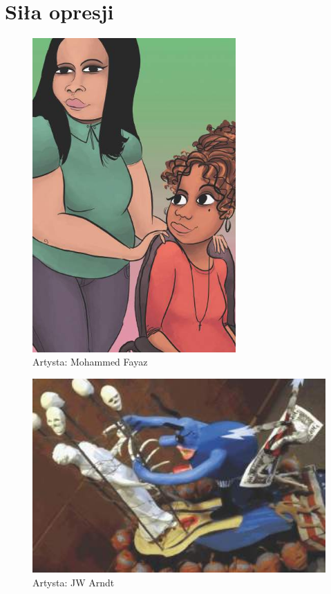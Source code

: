 \chapter{Siła opresji}
\begin{figure}[h]
\centering
\includegraphics[height=12cm]{TeX_files/2-0.png}
\caption{Artysta: Mohammed Fayaz}
\label{2-0}
\end{figure}


\newpage
\begin{figure}[h]
\centering
\includegraphics[width=16cm]{TeX_files/2-1.png}
\caption{Artysta: JW Arndt}
\label{2-1}
\end{figure}


